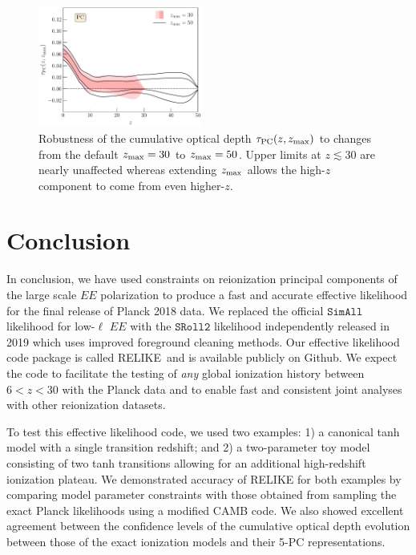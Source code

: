 \documentclass[prd,twocolumn,amsmath,amssymb,floatfix,superscriptaddress,nofootinbib]{revtex4-1}
\newcommand{\zmax}{z_{\rm max}}
\newcommand{\relike}{RELIKE}%
\begin{document}
{\begin{figure}[ht]
\includegraphics[width=0.48\textwidth]{paper/plots/pl18_taugtz_pl18_srollv2_pc_zmax30_vs_zmax50_do_rescale_tau_false.pdf}
\caption{Robustness of the cumulative optical depth $\tau_{\rm PC}(z, \zmax)$ to changes from the default $\zmax = 30$ to $\zmax = 50$. Upper limits at $z \lesssim 30$ are nearly unaffected whereas extending $\zmax$ allows the high-$z$ component to come from even higher-$z$.
}
\label{fig:plot_taugtz_zmax30_vs_zmax50}
\end{figure}


\section{Conclusion}
\label{sec:conclusion}

In conclusion, we have used constraints on reionization principal components of the large scale $EE$ polarization to produce a fast and accurate effective likelihood for the final release of Planck 2018 data.  We replaced the official $\texttt{SimAll}$ likelihood for low-$\ell$ $EE$ with the $\texttt{SRoll2}$ likelihood independently released in 2019 which uses improved foreground cleaning methods. Our effective likelihood code package is called \relike\  and is available publicly on Github.
We expect the code to facilitate the testing of \textit{any} global ionization history between $6 < z < 30$ with the Planck data and to enable fast and consistent joint analyses with other reionization datasets. 

To test this effective likelihood code, we used two examples: 1) a canonical tanh model with a single transition redshift; and 2) a two-parameter toy model consisting of two tanh transitions allowing for an additional high-redshift ionization plateau. We demonstrated accuracy of RELIKE for both examples by comparing model parameter constraints with those obtained from sampling the exact Planck likelihoods using a modified CAMB code. We also showed excellent agreement between the confidence levels of the cumulative optical depth evolution between those of the exact ionization models and their 5-PC representations.

}
\end{document}
